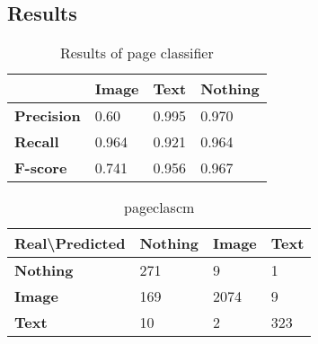\subsection{Results}
\label{subsec:pageclasresults}


\begin{table}
\centering
\begin{tabular}{l l l l}
\hline
  & \textbf{Image} & \textbf{Text} & \textbf{Nothing} \\\hline
\textbf{Precision} & 0.60  & 0.995 & 0.970 \\
\textbf{Recall} & 0.964  & 0.921 & 0.964 \\
\textbf{F-score} & 0.741 & 0.956 & 0.967 \\\hline
\end{tabular}
\caption{Results of page classifier}
\label{tab:pageclasresults}
\end{table}

\begin{table}
\centering
\begin{tabular}{l l l l}
\hline
Real\textbackslash Predicted & \textbf{Nothing} & \textbf{Image} & \textbf{Text} \\\hline
\textbf{Nothing} & 271 & 9 & 1 \\
\textbf{Image} & 169 & 2074 & 9 \\
\textbf{Text} & 10 & 2 & 323\\
\hline
\end{tabular}
\caption{pageclascm}
\label{tab:pageclascm}
\end{table}
